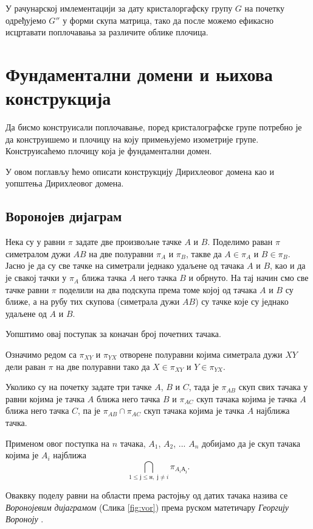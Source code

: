 \documentclass[12pt]{article}
\begin{document}
У рачунарској имлементацији за дату кристалоргафску групу $G$ на почетку одређујемо $G''$ у форми скупа матрица, тако да после можемо ефикасно исцртавати поплочавања за различите облике плочица.




\newpage
\section{Фундаментални домени и њихова конструкција}\label{dirihleova-fundamentalna-oblast} 

Да бисмо конструисали поплочавање, поред кристалографске групе потребно је да конструишемо и плочицу на коју примењујемо изометрије групе. Конструисаћемо плочицу која је фундаментални домен.

У овом поглављу ћемо описати конструкцију Дирихлеовог домена као и уопштења Дирихлеовог домена.
\subsection{Воронојев дијаграм}


Нека су у равни $\pi$ задате две произвољне тачке $A$ и $B$. Поделимо раван $\pi$ симетралом дужи $AB$ на две полуравни $\pi _A$ и $\pi _B$, такве да $A \in \pi _ A$ и $B \in \pi _B$. Јасно је да су све тачке на симетрали једнако удаљене од тачака $A$ и $B$, као и да је свакој тачки у $\pi _A$ ближа тачка $A$ него тачка $B$ и обрнуто. 
На тај начин смо све тачке равни $\pi$ поделили на два подскупа према томе којој од тачака $A$ и $B$ су ближе, а на рубу тих скупова (симетрала дужи $AB$) су тачке које су једнако удаљене од $A$ и $B$.

Уопштимо овај поступак за коначан број почетних тачака.

Означимо редом са $\pi _{XY}$ и $\pi _{YX}$ отворене полуравни којима симетрала дужи $XY$ дели раван $\pi$ на две полуравни тако да $X \in \pi _ {XY}$ и $Y \in \pi _{YX}$. 

Уколико су на почетку задате три тачке $A$, $B$ и $C$, тада је $\pi _{AB}$ скуп свих тачака у равни којима је тачка $A$ ближа него тачка $B$ и $\pi _{AC}$ скуп тачака којима је тачка $A$ ближа него тачка $C$, па је $\pi _{AB} \cap \pi _{AC}$ скуп тачака којима је тачка $A$ најближа тачка.

Применом овог поступка на  $n$ тачака, $A_1$, $A_2$, ... $A_n$ добијамо да је скуп тачака којима је $A_i$ најближа   $$\bigcap _{1\leq ј\leq н,\; ј\neq i} \pi_{A_i А_ј}.$$

Оваквку поделу равни на области према растојњу од датих тачака назива се \emph{Воронојевим дијаграмом} (Слика \ref{fig:vor}) према руском матетичару \emph{Георгију Вороноју} .
\end{document}
